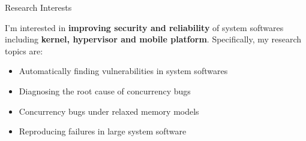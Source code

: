 \begin{rSection}{Research Interests}
\newcommand{\eg}{\textit{e}.\textit{g}.\xspace}

I'm interested in \textbf{improving security and reliability} of
system softwares including \textbf{kernel, hypervisor and mobile
  platform}. Specifically, my research topics are:
  \begin{itemize}[leftmargin=*,itemsep=-5pt]
  \item{Automatically finding vulnerabilities in system softwares}
  \item{Diagnosing the root cause of concurrency bugs}
  \item{Concurrency bugs under relaxed memory models}
  \item{Reproducing failures in large system software}
  \end{itemize}

\end{rSection}
